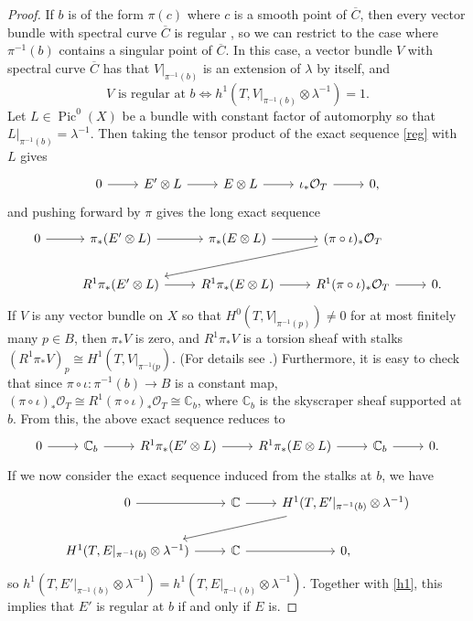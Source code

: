 \documentclass{article}[12pt]
\theoremstyle{definition}
\theoremstyle{remark}
\newcommand \C{\mathbb C}
\numberwithin{equation}{section}
\newcommand \mc{\mathcal}
\DeclareMathOperator{\Pic}{Pic}
\begin{document}
\begin{proof}
	If $b$ is of the form $\pi(c)$ where $c$ is a smooth point of $\overline{C}$, then every vector bundle with spectral curve $\overline{C}$ is regular \cite{MorHopf}, so we can restrict to the case where $\pi^{-1}(b)$ contains a singular point of $\overline{C}$. In this case, a vector bundle $V$ with spectral curve $\overline{C}$ has that $V|_{\pi^{-1}(b)}$ is an extension of $\lambda$ by itself, and  \begin{equation}\label{h1} V \text{ is regular at } b \Leftrightarrow h^1(T,V|_{\pi^{-1}(b)}\otimes \lambda^{-1})=1.\end{equation}  Let $L \in \Pic^0(X)$  be a bundle with constant factor of automorphy so that $L|_{\pi^{-1}(b)}=\lambda^{-1}$. Then taking the tensor product of the exact sequence \eqref{reg} with $L$ gives $$\begin{tikzcd}
		0\arrow[r] & E'\otimes L \arrow[r] & E\otimes L \arrow[r] & \iota_*\mc{O}_T\arrow[r] & 0,
	\end{tikzcd}$$
	and pushing forward by $\pi$ gives the long exact sequence
	$$\begin{tikzcd}
		0\arrow[r] & \pi_*(E'\otimes L) \arrow[r] & \pi_*(E\otimes L) \arrow[r] & (\pi\circ \iota)_*\mc{O}_T \arrow[lld]\\
		&R^1\pi_*(E'\otimes L) \arrow[r] & R^1\pi_*(E\otimes L) \arrow[r] & R^1(\pi\circ \iota)_*\mc{O}_T \arrow[r] & 0.
	\end{tikzcd}$$
	If $V$ is any vector bundle on $X$ so that $H^0(T,V|_{\pi^{-1}(p)})\neq 0$ for at most finitely many $p \in B$, then $\pi_*V$ is zero, and $R^1\pi_*V$ is a torsion sheaf with stalks $(R^1\pi_*V)_p\cong H^1(T,V|_{\pi^{-1}(p})$. (For details see \cite{BrMoFM}.) Furthermore, it is easy to check that since $\pi\circ \iota:\pi^{-1}(b)\to B$ is a constant map, $(\pi\circ \iota)_*\mc{O}_T\cong R^1(\pi\circ\iota)_*\mc{O}_T\cong \C_b$, where $\C_b$ is the skyscraper sheaf supported at $b$. From this, the above exact sequence reduces to $$\begin{tikzcd}
		0\arrow[r] & \C_b\arrow[r] & R^1\pi_*(E'\otimes L)\arrow[r] & R^1\pi_*(E\otimes L)\arrow[r] & \C_b \arrow[r] & 0.
	\end{tikzcd}$$
	If we now consider the exact sequence induced from the stalks at $b$, we have $$\begin{tikzcd}0 \arrow[r] & \C\arrow[r] & H^1(T,E'|_{\pi^{-1}(b)}\otimes \lambda^{-1}) \arrow[lld]\\ H^1(T,E|_{\pi^{-1}(b)}\otimes \lambda^{-1})\arrow[r] & \C\arrow[r] & 0,
	\end{tikzcd}$$
	so $h^1(T,E'|_{\pi^{-1}(b)}\otimes \lambda^{-1})= h^1(T,E|_{\pi^{-1}(b)}\otimes \lambda^{-1})$. Together with \eqref{h1}, this implies that $E'$ is regular at $b$ if and only if $E$ is. 
\end{proof}
\end{document}

